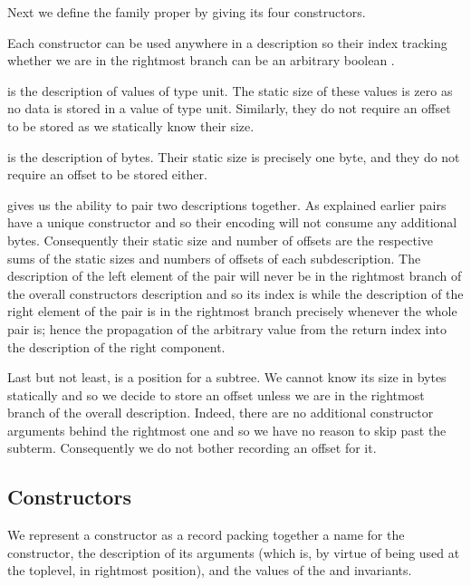 Next we define the family proper by giving its four constructors.


Each constructor can be used anywhere in a description so their index
tracking whether we are in the rightmost branch can be an arbitrary
boolean .

 is the description of values of type unit. The static
size of these values is zero as no data is stored in a value of type unit.
Similarly, they do not require an offset to be stored as we statically
know their size.

 is the description of bytes.
%
Their static size is precisely one byte, and they do not require an
offset to be stored either.

 gives us the ability to pair two descriptions together.
As explained earlier pairs have a unique constructor and so their encoding
will not consume any additional bytes.
Consequently their static size and number of offsets are the respective
sums of the static sizes and numbers of offsets of each subdescription.
%
The description of the left element of the pair will never be in the
rightmost branch of the overall constructors description and so its
index is  while the description of the right element
of the pair is in the rightmost branch precisely whenever the whole pair
is; hence the propagation of the  arbitrary value from the
return index into the description of the right component.

Last but not least,  is a position for a subtree.
We cannot know its size in bytes statically and so we decide to store
an offset unless we are in the rightmost branch of the overall description.
%
Indeed, there are no additional constructor arguments behind the rightmost
one and so we have no reason to skip past the subterm. Consequently we
do not bother recording an offset for it.


\subsection{Constructors}

We represent a constructor as a record packing together
a name for the constructor,
the description of its arguments (which is, by virtue of
being used at the toplevel, in rightmost position),
and the values of the  and
 invariants.

